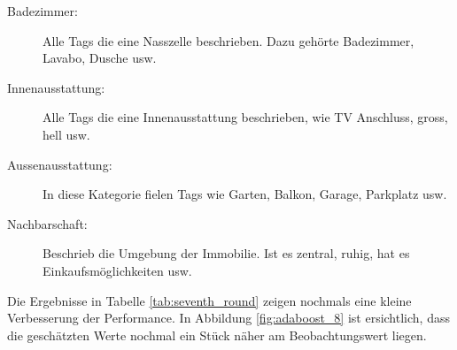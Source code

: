 \begin{description}
\item[Badezimmer:] Alle Tags die eine Nasszelle beschrieben. Dazu gehörte Badezimmer, Lavabo, Dusche usw.
\item[Innenausstattung:] Alle Tags die eine Innenausstattung beschrieben, wie TV Anschluss, gross, hell usw.
\item[Aussenausstattung:] In diese Kategorie fielen Tags wie Garten, Balkon, Garage, Parkplatz usw.
\item[Nachbarschaft:] Beschrieb die Umgebung der Immobilie. Ist es zentral, ruhig, hat es Einkaufsmöglichkeiten usw.
\end{description}

\begin{table}[ht]
\centering
{}
\caption{Ergebnisse mit gruppierten Tags}
\label{tab:seventh_round}
\end{table}

Die Ergebnisse in Tabelle \ref{tab:seventh_round} zeigen nochmals eine kleine Verbesserung der Performance. In Abbildung \ref{fig:adaboost_8} ist ersichtlich, dass die geschätzten Werte nochmal ein Stück näher am Beobachtungswert liegen.


